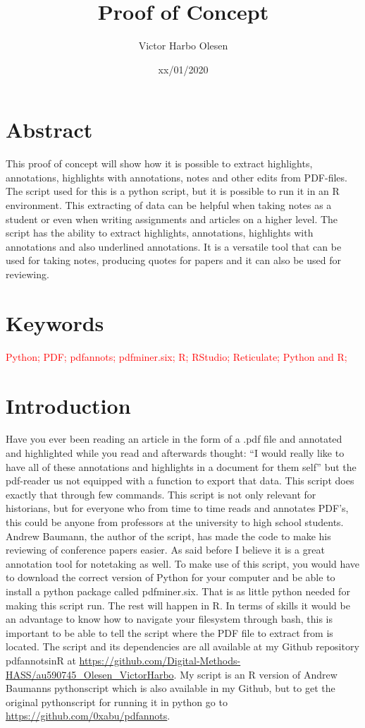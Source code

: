 \documentclass{article}
\title{Proof of Concept}
\author{Victor Harbo Olesen}
\date{xx/01/2020}
\begin{document}
\maketitle

\section{Abstract}
This proof of concept will show how it is possible to extract highlights, annotations, highlights with annotations, notes and other edits from PDF-files. The script used for this is a python script, but it is possible to run it in an R environment. This extracting of data can be helpful when taking notes as a student or even when writing assignments and articles on a higher level. The script has the ability to extract highlights, annotations, highlights with annotations and also underlined annotations. It is a versatile tool that can be used for taking notes, producing quotes for papers and it can also be used for reviewing.
\section{Keywords}
\textcolor{red}{Python; PDF; pdfannots; pdfminer.six; R; RStudio; Reticulate; Python and R;} 
\section{Introduction}
Have you ever been reading an article in the form of a .pdf file and annotated and highlighted while you read and afterwards thought: “I would really like to have all of these annotations and highlights in a document for them self” but the pdf-reader us not equipped with a function to export that data. This script does exactly that through few commands. This script is not only relevant for historians, but for everyone who from time to time reads and annotates PDF’s, this could be anyone from professors at the university to high school students. Andrew Baumann, the author of the script, has made the code to make his reviewing of conference papers easier. As said before I believe it is a great annotation tool for notetaking as well. \newline
To make use of this script, you would have to download the correct version of Python for your computer and be able to install a python package called pdfminer.six. That is as little python needed for making this script run. The rest will happen in R. In terms of skills it would be an advantage to know how to navigate your filesystem through bash, this is important to be able to tell the script where the PDF file to extract from is located.\newline
The script and its dependencies are all available at my Github repository pdfannots\textunderscore in\textunderscore R at \url{https://github.com/Digital-Methods-HASS/au590745_Olesen_VictorHarbo}. My script is an R version of Andrew Baumanns pythonscript which is also available in my Github, but to get the original pythonscript for running it in python go to \url{https://github.com/0xabu/pdfannots}. 
\end{document}
